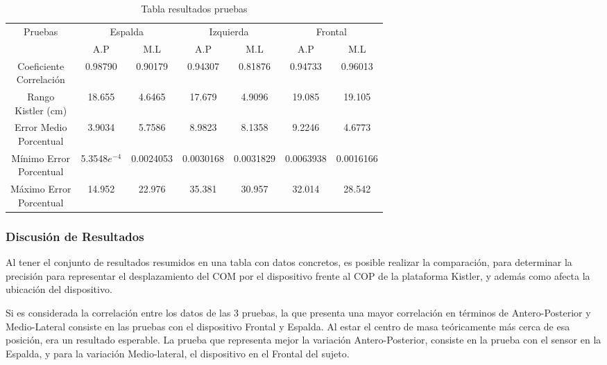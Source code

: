 \documentclass[12pt,a4paper]{article}
\begin{document}
\begin{table}[H]
	\centering
	\begin{tabular}{|c|c|c|c|c|c|c|}
		\hline
		\multirow{2}{*}{Pruebas} &
		\multicolumn{2}{c|}{Espalda} &
		\multicolumn{2}{c|}{Izquierda} &
		\multicolumn{2}{c|}{Frontal} \\
		\cline{2-7}
		& A.P & M.L & A.P  & M.L & A.P & M.L \\
		\hline
		\shortstack{Coeficiente\\Correlación} & 0.98790 &0.90179 & 0.94307 & 0.81876 & 0.94733 & 0.96013 \\
		\hline
		\shortstack{Rango\\Kistler (cm)} & 18.655 & 4.6465 & 17.679 & 4.9096 & 19.085 & 19.105 \\
		\hline
		\shortstack{Error Medio\\Porcentual} & 3.9034 & 5.7586 & 8.9823 & 8.1358 & 9.2246 & 4.6773 \\
		\hline
		\shortstack{Mínimo Error\\Porcentual} & 5.3548$e^{-4}$ & 0.0024053 & 0.0030168 & 0.0031829 & 0.0063938 & 0.0016166 \\
		\hline
		\shortstack{Máximo Error\\Porcentual} & 14.952 & 22.976 & 35.381& 30.957 & 32.014 & 28.542 \\
		\hline
	\end{tabular}
	\caption{Tabla resultados pruebas}
	\label{table:resultadosPruebas}
\end{table}	

\subsubsection{Discusión de Resultados}
Al tener el conjunto de resultados resumidos en una tabla con datos concretos, es posible realizar la comparación, para determinar la precisión para representar el desplazamiento del COM por el dispositivo frente al COP de la plataforma Kistler, y además como afecta la ubicación del dispositivo.

Si es considerada la correlación entre los datos de las 3 pruebas, la que presenta una mayor correlación en términos de Antero-Posterior y Medio-Lateral consiste en las pruebas con el dispositivo Frontal y Espalda. Al estar el centro de masa teóricamente más cerca de esa posición, era un resultado esperable. La prueba que representa mejor la variación Antero-Posterior, consiste en la prueba con el sensor en la Espalda, y para la variación Medio-lateral, el dispositivo en el Frontal del sujeto.
\end{document}
